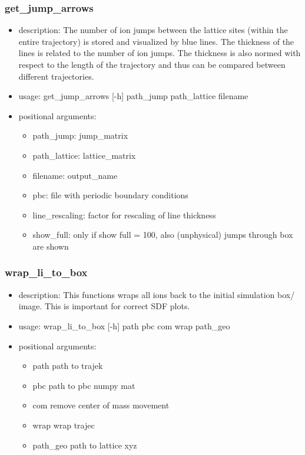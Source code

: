 \documentclass{article}
\begin{document}
\subsubsection{get\_jump\_arrows}
\begin{itemize}

\item description: The  number of ion jumps  between the lattice sites (within the entire trajectory) is stored and visualized by blue lines. The thickness of the lines is related to the number of ion jumps. The thickness is also normed with respect to the length of the trajectory and thus can be compared between different trajectories.

\item usage: get\_jump\_arrows [-h] path\_jump path\_lattice filename

\item  positional arguments:
\begin{itemize}
 \item path\_jump:     jump\_matrix
 \item path\_lattice:  lattice\_matrix
 \item filename:      output\_name
 \item pbc:             file with periodic boundary conditions

  \item line\_rescaling:  factor for rescaling of line thickness
  \item show\_full:       only if show full = 100, also (unphysical) jumps through box
                  are shown

\end{itemize}
\end{itemize}


\subsubsection{wrap\_li\_to\_box}

\begin{itemize}
\item description: This functions wraps all ions back to the initial simulation box/ image. This is important for correct SDF plots. 
%
\item usage: wrap\_li\_to\_box [-h] path pbc com wrap path\_geo

\item  positional arguments:
\begin{itemize}
\item  path        path to trajek
%
\item pbc         path to pbc numpy mat
\item  com         remove center of mass movement
\item  wrap        wrap trajec
\item  path\_geo    path to lattice xyz
%
%
%
\end{itemize}
\end{itemize}
\end{document}
